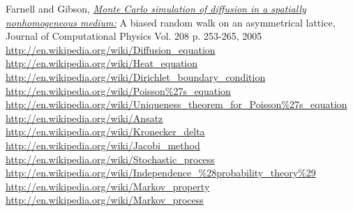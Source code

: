 \documentclass[11pt,english,a4paper]{article}
\begin{document}
\begin{flushleft}
\begin{thebibliography}{1}
Farnell and Gibson, \href{https://vpn2.uio.no/+CSCO+00756767633A2F2F6A6A6A2E667076726170727176657270672E70627A++/science/article/pii/S0021999105001087#}
{\emph{Monte Carlo simulation of diffusion in a spatially
nonhomogeneous medium:}} A biased random walk
on an asymmetrical lattice, Journal of Computational Physics Vol. 208 p. 253-265, 2005
\href{http://en.wikipedia.org/wiki/Diffusion\_equation}{http://en.wikipedia.org/wiki/Diffusion\_equation}
\href{http://en.wikipedia.org/wiki/Heat\_equation}{http://en.wikipedia.org/wiki/Heat\_equation}
\href{http://en.wikipedia.org/wiki/Dirichlet\_boundary\_condition}{http://en.wikipedia.org/wiki/Dirichlet\_boundary\_condition}
\href{http://en.wikipedia.org/wiki/Poisson\%27s\_equation}{http://en.wikipedia.org/wiki/Poisson\%27s\_equation}
\href{http://en.wikipedia.org/wiki/Uniqueness\_theorem\_for\_Poisson\%27s\_equation}{http://en.wikipedia.org/wiki/Uniqueness\_theorem\_for\_Poisson\%27s\_equation}
\href{http://en.wikipedia.org/wiki/Ansatz}{http://en.wikipedia.org/wiki/Ansatz}
\href{http://en.wikipedia.org/wiki/Kronecker\_delta}{http://en.wikipedia.org/wiki/Kronecker\_delta}
\href{http://en.wikipedia.org/wiki/Jacobi\_method}{http://en.wikipedia.org/wiki/Jacobi\_method}
\href{http://en.wikipedia.org/wiki/Stochastic\_process}{http://en.wikipedia.org/wiki/Stochastic\_process}
\href{http://en.wikipedia.org/wiki/Independence\_\%28probability\_theory\%29}{http://en.wikipedia.org/wiki/Independence\_\%28probability\_theory\%29}
\href{http://en.wikipedia.org/wiki/Markov\_property}{http://en.wikipedia.org/wiki/Markov\_property}
\href{http://en.wikipedia.org/wiki/Markov\_process}{http://en.wikipedia.org/wiki/Markov\_process}

\end{thebibliography}
\end{flushleft}
\end{document}
